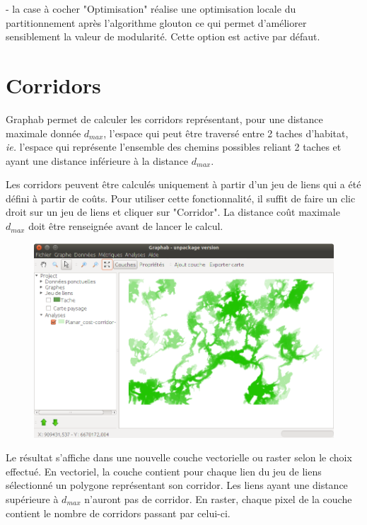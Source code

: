 \documentclass{article}
\begin{document}
{}- la case à cocher "Optimisation" réalise une optimisation locale du partitionnement après l'algorithme glouton ce qui permet d'améliorer sensiblement la valeur de modularité. Cette option est active par défaut.

\section{Corridors}

Graphab permet de calculer les corridors représentant, pour une distance maximale donnée $d_{max}$, l'espace qui peut être traversé entre 2 taches d'habitat, \textit{ie.} l'espace qui représente l'ensemble des chemins possibles reliant 2 taches et ayant une distance inférieure à la distance $d_{max}$.

Les corridors peuvent être calculés uniquement à partir d'un jeu de liens qui a été défini à partir de coûts. Pour utiliser cette fonctionnalité, il suffit de faire un clic droit sur un jeu de liens et cliquer sur "Corridor".
La distance coût maximale $d_{max}$ doit être renseignée avant de lancer le calcul.

\begin{figure}[H]
	\includegraphics[scale=0.5]{img/manual-fr_corridor.png} 
\end{figure}

Le résultat s'affiche dans une nouvelle couche vectorielle ou raster selon le choix effectué. En vectoriel, la couche contient pour chaque lien du jeu de liens sélectionné un polygone représentant son corridor. Les liens ayant une distance supérieure à $d_{max}$ n'auront pas de corridor. En raster, chaque pixel de la couche contient le nombre de corridors passant par celui-ci.
\end{document}
